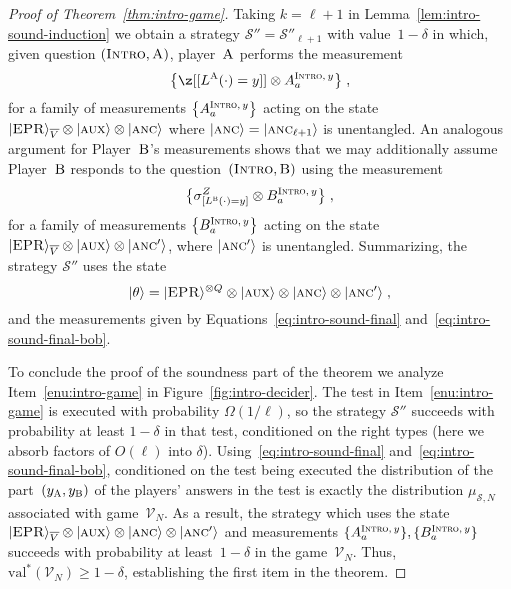 \documentclass[11pt]{article}
\theoremstyle{definition}
\newcommand{\ket}[1]{|#1\rangle}
\newcommand{\val}{\ensuremath{\mathrm{val}}}
\newcommand{\sampler}{\mathcal{S}}
\newcommand{\verifier}{\mathcal{V}}
\newcommand{\strategy}{\mathscr{S}}
\newcommand{\labelstyle}[1]{\ensuremath{\textsc{#1}}\xspace}
\newcommand{\EPR}{\labelstyle{EPR}}
\newcommand{\aux}{\labelstyle{aux}}
\newcommand{\ancilla}{\labelstyle{anc}}
\newcommand{\alice}{\labelstyle{A}}
\newcommand{\bob}{\labelstyle{B}}
\newcommand{\typestyle}[1]{\ensuremath{\textsc{#1}}\xspace}
\newcommand{\Introspect}{\typestyle{Intro}}
\newcommand{\Intro}{\typestyle{Intro}}
\newcommand{\tnote}[1]{}
\begin{document}
\begin{proof}[Proof of Theorem~\ref{thm:intro-game}]
  Taking $k = \ell+1$ in Lemma~\ref{lem:intro-sound-induction} we obtain a
  strategy $\strategy''=\strategy''_{\ell+1}$ with value~$1-\delta$ in which,
  given question $(\Introspect, \alice)$, player~$\alice$ performs the
  measurement
  \begin{equation}
    \label{eq:intro-sound-final}
    \bigl\{ \z[{[L^\alice(\cdot)=y]}] \otimes A^{\Intro,\, y}_a \bigr\} \;,
  \end{equation}
  for a family of measurements $\bigl\{ A^{\Intro,\, y}_a \bigr\}$ acting on the
  state $\ket{\EPR}_{\overline{V}} \otimes \ket{\aux} \otimes \ket{\ancilla}$
  where $\ket{\ancilla}=\ket{\ancilla_{\ell+1}}$ is unentangled.
  An analogous argument for Player~$\bob$'s measurements shows that we may
  additionally assume Player~$\bob$ responds to the question~$(\Introspect,
  \bob)$ using the measurement
  \begin{equation}
    \label{eq:intro-sound-final-bob}
    \bigl\{\sigma^Z_{[L^\bob(\cdot)=y]} \otimes
    B^{\Intro,\, y}_a\bigr\}\;,  
  \end{equation}
  for a family of measurements $\bigl\{ B^{\Intro,\, y}_a \bigr\}$ acting on the
  state $\ket{\EPR}_{\overline{V}} \otimes\ket{\aux} \otimes \ket{\ancilla'}$,
  where $\ket{\ancilla'}$ is unentangled.
  Summarizing, the strategy $\strategy''$ uses the state
  \begin{equation*}
    \ket{\theta} = \ket{\EPR}^{\otimes Q} \otimes \ket{\aux} \otimes
    \ket{\ancilla} \otimes \ket{\ancilla'}\;,
  \end{equation*}
  and the measurements given by Equations~\eqref{eq:intro-sound-final}
  and~\eqref{eq:intro-sound-final-bob}.
  
	To conclude the proof of the soundness part of the theorem we analyze
  Item~\ref{enu:intro-game} in Figure~\ref{fig:intro-decider}.
  The test in Item~\ref{enu:intro-game} is executed with probability
  $\Omega(1/\ell)$, so the strategy $\strategy''$ succeeds with probability at
  least $1 - \delta$ in that test, conditioned on the right types (here we
  absorb factors of $O(\ell)$ into $\delta$).
  Using~\eqref{eq:intro-sound-final} and~\eqref{eq:intro-sound-final-bob},
  conditioned on the test being executed the distribution of the
  part~$(y_\alice, y_\bob)$ of the players' answers in the test is exactly the
  distribution $\mu_{\sampler, N}$ associated with game~$\verifier_N$.
  As a result, the strategy which uses the state $\ket{\EPR}_{\overline{V}} \otimes
  \ket{\aux} \otimes \ket{\ancilla} \otimes \ket{\ancilla'}$ and measurements $
  \{ A^{\Intro,\, y}_a \},\{ B^{\Intro,\, y}_a \}$ succeeds with probability at
  least~$1- \delta$ in the game~$\verifier_N$.
  Thus, $\val^*(\verifier_N) \geq 1- \delta$, establishing the first item in the
  theorem.


\end{proof}
\end{document}
